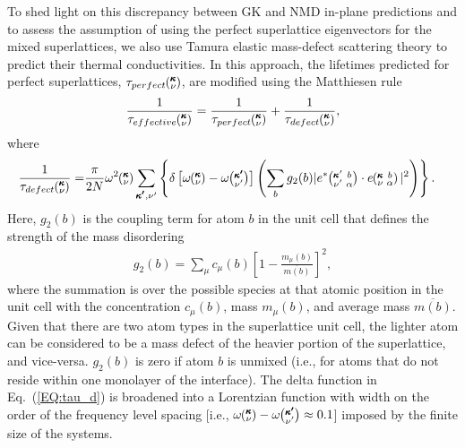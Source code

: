 \documentclass[aps,prb,preprint,preprintnumbers,amsmath,amssymb,floatfix,superscriptaddress]{revtex4}
\newcommand{\kvba}{\mspace{-4.0mu}\left(\mspace{-8.0mu}
\begin{smallmatrix} &\pmb{\kappa} &b \\ &\nu &\alpha\end{smallmatrix}
\mspace{-3.0mu}\right)}
\newcommand{\kvbap}{\mspace{-4.0mu}\left(\mspace{-8.0mu}
\begin{smallmatrix} &\pmb{\kappa}' &b \\ &\nu' &\alpha\end{smallmatrix}
\mspace{-3.0mu}\right)}
\newcommand{\kv}{\mspace{-4.0mu}\left(\mspace{-8.0mu}
\begin{smallmatrix}&\pmb{\kappa} \\&\nu\end{smallmatrix}
\mspace{-3.0mu}\right)}
\newcommand{\kvp}{\mspace{-4.0mu}\left(\mspace{-8.0mu}
\begin{smallmatrix}&\pmb{\kappa'} \\&\nu'\end{smallmatrix}
\mspace{-3.0mu}\right)}
\begin{document}
To shed light on this discrepancy between GK and NMD in-plane predictions and to assess the assumption of using the perfect superlattice eigenvectors for the mixed superlattices, we also use Tamura elastic mass-defect scattering theory to predict their thermal conductivities. \cite{tamura_isotope_1983,PhysRevB.87.140302,Luckyanova16112012} In this approach, the lifetimes predicted for perfect superlattices, $\tau_{perfect}\kv$, are modified using the Matthiesen rule %
\begin{equation}\label{EQ:tau_eff}
\begin{split}
\frac{1}{\tau_{effective}\kv} = \frac{1}{\tau_{perfect}\kv} +\frac{1}{\tau_{defect}\kv},
\end{split}
\end{equation}
where
\begin{equation}\label{EQ:tau_d}
\begin{split}
\frac{1}{\tau_{defect}\kv} = &\frac{\pi}{2N}\omega^2\kv \sum_{\pmb{\kappa'},\nu'} \left\{ \delta\left[ \omega\kv - \omega\kvp \right]
\left (\sum_{b} g_2(b) |e^*\kvbap \cdot e\kvba |^2 \right )\right \} .
\end{split}
\end{equation}
Here, $g_2(b)$ is the coupling term for atom $b$ in the unit cell that defines the strength of the mass disordering
\begin{equation}\label{EQ:g(b)}
\begin{split}
g_2(b) = \sum_\mu c_{\mu}(b)\left[1-\frac{m_{\mu}(b)}{\overline{m(b)}}\right]^2, 
\end{split}
\end{equation}
where the summation is over the possible species at that atomic position in the unit cell with the concentration $c_\mu(b)$, mass $m_\mu(b)$, and average mass $\overline{m(b)}$. Given that there are two atom types in the superlattice unit cell, the lighter atom can be considered to be a mass defect of the heavier portion of the superlattice, and vice-versa. $g_2(b)$ is zero if atom $b$ is unmixed (i.e., for atoms that do not reside within one monolayer of the interface). The delta function in Eq.~(\ref{EQ:tau_d}) is broadened into a Lorentzian function with width on the order of the frequency level spacing [i.e., $\omega \kv -\omega \kvp \approx 0.1$] imposed by the finite size of the systems.\cite{allen_thermal_1993}
\end{document}
